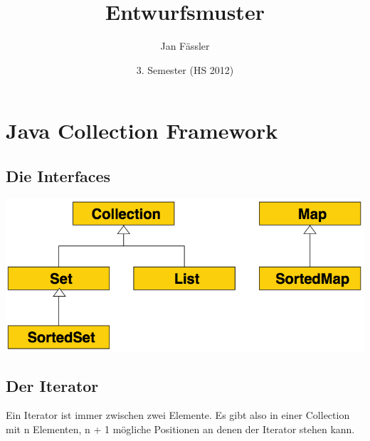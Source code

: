 \documentclass[a4paper, 11pt]{article}
\title{Entwurfsmuster}
\author{Jan Fässler}
\date{3. Semester (HS 2012)}
\begin{document}
\maketitle
\thispagestyle{fancy}

\newpage

\tableofcontents	  	


\newpage
\setcounter{page}{1}


\section{Java Collection Framework}
\subsection{Die Interfaces}
\begin{center}
\includegraphics[scale=0.3]{jcf-interfaces.png}
\end{center}

\subsection{Der Iterator}
Ein Iterator ist immer zwischen zwei Elemente. Es gibt also in einer Collection mit n Elementen, n + 1 mögliche Positionen an denen der Iterator stehen kann.

\end{document}
